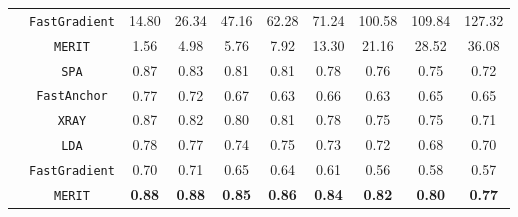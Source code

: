 \documentclass[10pt,xcolor={usenames,dvipsnames,table}]{beamer}
\def\blue{\color{blue}}
\begin{document}
\begin{frame}
\begin{table}
{\begin{tabular}{|p{1.2cm}|c|c|c|c|c|c|c|c|c|}
        \cline{2-10}
        & \texttt{FastGradient} & 14.80 & 26.34 & 47.16 & 62.28 & 71.24 & 100.58& 109.84& 127.32 \\
        \cline{2-10}
        \rowcolor{green!10}& \texttt{MERIT} & 1.56 & 4.98 & 5.76 & 7.92 & 13.30 & 21.16 & 28.52 & 36.08 \\
        \cline{2-10}
        \hhline{|=|=|=|=|=|=|=|=|=|=|}
        \multirow{6}{1.6cm}{Accuracy $(\uparrow)$}
          & \texttt{SPA} & {\blue 0.87} & {\blue 0.83} & {\blue 0.81} & {\blue 0.81} & {\blue 0.78} & {\blue 0.76} & {\blue 0.75} & {\blue 0.72} \\
        \cline{2-10}
        & \texttt{FastAnchor} & 0.77 & 0.72 & 0.67 & 0.63 & 0.66 & 0.63 & 0.65 & 0.65  \\
        \cline{2-10}
        & \texttt{XRAY} & {\blue 0.87} & 0.82 & 0.80 & {\blue 0.81} & {\blue 0.78} & {\blue 0.75} & {\blue 0.75} & 0.71 \\
        \cline{2-10}
        & \texttt{LDA} & 0.78 & 0.77 & 0.74 & 0.75 & 0.73 & 0.72 & 0.68 & 0.70 \\
        \cline{2-10}
        & \texttt{FastGradient} & 0.70 & 0.71 & 0.65 & 0.64 & 0.61 & 0.56 & 0.58 & 0.57 \\
        \cline{2-10}
          \rowcolor{green!10} & \texttt{MERIT} & \textbf{0.88} & \textbf{0.88} & \textbf{0.85} & \textbf{0.86} & \textbf{0.84} & \textbf{0.82} & \textbf{0.80} & \textbf{0.77} \\
         \cline{2-10}
        \hline 
    \end{tabular}}
    \end{table}
\end{frame}
\end{document}
